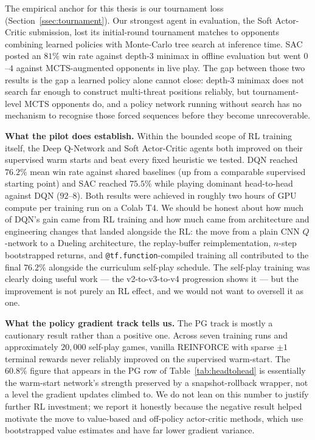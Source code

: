 \documentclass[11pt]{article}
\begin{document}
The empirical anchor for this thesis is our tournament loss
(Section~\ref{ssec:tournament}). Our strongest agent in evaluation,
the Soft Actor-Critic submission, lost its initial-round tournament
matches to opponents combining learned policies with Monte-Carlo tree
search at inference time. SAC posted an $81\%$ win rate against
depth-$3$ minimax in offline evaluation but went $0$--$4$ against
MCTS-augmented opponents in live play. The gap between those two
results is the gap a learned policy alone cannot close: depth-$3$
minimax does not search far enough to construct multi-threat
positions reliably, but tournament-level MCTS opponents do, and a
policy network running without search has no mechanism to recognise
those forced sequences before they become unrecoverable.

\textbf{What the pilot does establish.} Within the bounded scope of
RL training itself, the Deep Q-Network and Soft Actor-Critic agents
both improved on their supervised warm starts and beat every fixed
heuristic we tested. DQN reached $76.2\%$ mean win rate against
shared baselines (up from a comparable supervised starting point) and
SAC reached $75.5\%$ while playing dominant head-to-head against
DQN ($92$--$8$). Both results were achieved in roughly two hours of
GPU compute per training run on a Colab T4. We should be honest
about how much of DQN's gain came from RL training and how much came
from architecture and engineering changes that landed alongside the
RL: the move from a plain CNN $Q$-network to a Dueling architecture,
the replay-buffer reimplementation, $n$-step bootstrapped returns,
and \texttt{@tf.function}-compiled training all contributed to the
final $76.2\%$ alongside the curriculum self-play schedule. The
self-play training was clearly doing useful work --- the v2-to-v3-to-v4
progression shows it --- but the improvement is not purely an RL
effect, and we would not want to oversell it as one.

\textbf{What the policy gradient track tells us.} The PG track is
mostly a cautionary result rather than a positive one. Across seven
training runs and approximately $20{,}000$ self-play games, vanilla
REINFORCE with sparse $\pm 1$ terminal rewards never reliably
improved on the supervised warm-start. The $60.8\%$ figure that
appears in the PG row of Table~\ref{tab:headtohead} is essentially
the warm-start network's strength preserved by a snapshot-rollback
wrapper, not a level the gradient updates climbed to. We do not lean
on this number to justify further RL investment; we report it
honestly because the negative result helped motivate the move to
value-based and off-policy actor-critic methods, which use
bootstrapped value estimates and have far lower gradient variance.
\end{document}

